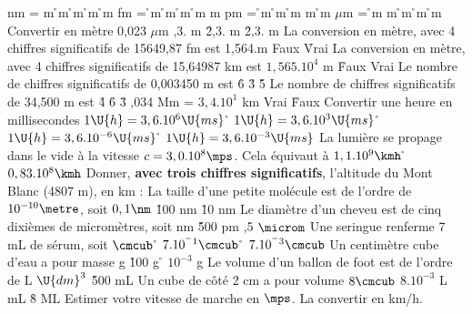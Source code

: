  nm =
\rv
\moinsneuf m
\r
\moinssix m
\r
\moinstrois m
\r
\moinsdouze m
\r
\moinsquinze m
 fm =
\r
\moinsneuf m
\r
\moinssix m
\r
\moinstrois m
\r
\moinsdouze m
\rv
\moinsquinze m
 pm =
\r
\moinsneuf m
\r
\moinssix m
\r
\moinstrois m
\rv
\moinsdouze m
\r
\moinsquinze m
 $\mu$m =
\r
\moinsneuf m
\rv
\moinssix m
\r
\moinstrois m
\r
\moinsdouze m
\r
\moinsquinze m
\q
Convertir en mètre 0,023 $\mu$m
,3. \moinshuit m
\r
2,3. \moinssix m
\r
2,3. \moinsquatre m
\q
La conversion en mètre, avec 4 chiffres significatifs de 15649,87 fm est 1,564.\moinsdix m
\rv 
Faux
\r
Vrai
\q
La conversion en mètre, avec 4 chiffres significatifs de 15,64987 km est $1,565.10^4$ m
\r 
Faux
\rv
Vrai
\q
Le nombre de chiffres significatifs de 0,003450 m est
\r
6
\r
3
\r
5
\q
Le nombre de chiffres significatifs de 34,500 m est
\r
4
\r
6
\r
3
,034 Mm = $3,4.10^1$ km
\rv
Vrai
\r
Faux
\q
Convertir une heure en millisecondes
\rv
$1 \U{h} = 3,6.10^6 \U{ms}$
\r
$1 \U{h} = 3,6.10^3 \U{ms}$
\r
$1 \U{h} = 3,6.10^{-6} \U{ms}$
\r
$1 \U{h} = 3,6.10^{-3} \U{ms}$
\q
La lumière se propage dans le vide à  la vitesse $c=3,0.10^8\mps$.
Cela équivaut à  
\rv
$1,1.10^9\kmh$
\r
$0,83.10^8\kmh$
\q 
Donner, \textbf{avec trois chiffres significatifs}, l'altitude du Mont Blanc	(4807 m), en km :
\q
La taille d'une petite molécule	est de l'ordre de $10^{-10}\metre$, soit
\rv
$0,1 \nm$
\r
100 nm
\r
10 nm	
\q
Le diamètre d'un cheveu	est de cinq dixièmes de micromètres, soit
 nm
\r
500 pm
,5 $\microm$
\q 
Une seringue renferme 7 mL de sérum, soit
 $\cmcub$
\r
$7.10^{^-1}\cmcub$
\r
$7.10^{^-3}\cmcub$
\q
Un centimètre cube d'eau a pour masse
 g
\r
100 g
\r
$10^{-3}$ g
\q
Le volume d'un ballon de foot est de l'ordre de 
 L
 $\U{dm}^{3}$
\r
500 mL
\q
Un cube de côté 2 cm a pour volume
\rv
$8 \cmcub$
\rv
$8.10^{-3}$ L 
 mL
\r
8 ML
\q
Estimer votre vitesse de marche en $\mps$. La convertir en km/h.
